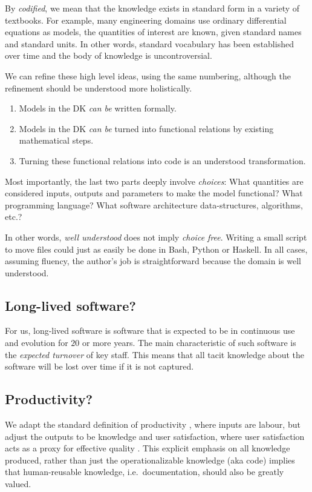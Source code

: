 \documentclass[sigconf,review,anonymous=false]{acmart}
\begin{document}
By \emph{codified}, we mean that the knowledge exists in standard form in a
variety of textbooks. For example, many engineering domains use
ordinary differential equations as models, the quantities of
interest are known, given standard names and standard units. In other words,
standard vocabulary has been established over time and the body of knowledge is
uncontroversial.

We can refine these high level ideas, using the same numbering,
although the refinement should be
understood more holistically.
\begin{enumerate}
\item Models in the DK \emph{can be} written formally.
\item Models in the DK \emph{can be} turned into functional relations by
 existing mathematical steps.
\item Turning these functional relations into code is an understood
 transformation.
\end{enumerate}
Most importantly, the last two parts
deeply involve \emph{choices}: What quantities are considered inputs, outputs
and parameters to make the model functional? What programming language?  What
software architecture data-structures, algorithms, etc.?

In other words,
\emph{well understood} does not imply \emph{choice free}.  Writing a small 
script to move files could just as easily be done in Bash, Python or Haskell.
In all cases, assuming fluency, the author's job is straightforward because
the domain is well understood.

\subsection{Long-lived software?}
For us, long-lived software is software that is expected to be in continuous
use and evolution for $20$ or more years. The main characteristic of
such software is the \emph{expected turnover} of key staff. This means that
all tacit knowledge about the software will be lost over time if it is not
captured.

\subsection{Productivity?}
We adapt the standard definition of productivity \cite{Boehm1987}, where inputs are labour,
but adjust the outputs to be knowledge and user satisfaction, where user
satisfaction acts as a proxy for effective quality
.
This explicit emphasis on all knowledge produced, rather than just the
operationalizable knowledge (aka code) 
implies that human-reusable knowledge, i.e.\ documentation, should also be
greatly valued.
\end{document}
